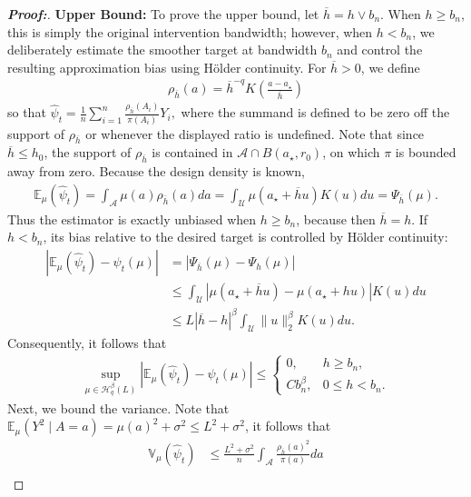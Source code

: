 \documentclass[11pt,twoside]{article}
\theoremstyle{definition}
\theoremstyle{remark}
\begin{document}
\begin{proof}[\textbf{Proof:}]
\textbf{Upper Bound:} To prove the upper bound, let $\overline h=h\vee b_n$. When $h\geq b_n$, this is simply the original intervention bandwidth; however, when $h<b_n$, we deliberately estimate the smoother target at bandwidth $b_n$ and control the resulting approximation bias using H\"older continuity. For $\overline{h}>0$, we define
\begin{align*}
    \rho_{\overline{h}}(a) = \overline{h}^{-q} K\!\left(\frac{a-a_\star}{\overline{h}}\right)
\end{align*}
so that $\widehat\psi_t = \frac{1}{n} \sum_{i=1}^n \frac{\rho_{\overline{h}}(A_i)}{\pi(A_i)}Y_i,$ where the summand is defined to be zero off the support of $\rho_{\overline{h}}$ or whenever the displayed ratio is undefined. Note that since $\overline{h}\leq h_0$, the support of $\rho_{\overline{h}}$ is contained in $\mathcal{A}\cap B(a_\star,r_0)$, on which $\pi$ is bounded away from zero. Because the design density is known,
\begin{align*}
    \mathbb{E}_\mu(\widehat\psi_t) = \int_{\mathcal{A}} \mu(a)\rho_{\overline{h}}(a)da = \int_{\mathcal{U}} \mu(a_\star+\overline h u)K(u)du = \Psi_{\overline{h}}(\mu).
\end{align*}
Thus the estimator is exactly unbiased when $h\geq b_n$, because then $\overline{h}=h$. If $h<b_n$, its bias relative to the desired target is controlled by H\"older continuity:
\begin{align*}
    \left| \mathbb{E}_\mu(\widehat\psi_t)-\psi_t(\mu) \right| &= |\Psi_{\overline{h}}(\mu)-\Psi_h(\mu)| \\
    &\leq \int_{\mathcal{U}} \left| \mu(a_\star+\overline{h} u) - \mu(a_\star+hu) \right| K(u)du \\
    &\leq L|\overline{h}-h|^\beta \int_{\mathcal{U}} \|u\|_2^\beta K(u)du.
\end{align*}
Consequently, it follows that
\begin{align*}
    \sup_{\mu\in\mathcal{H}_q^\beta(L)} \left| \mathbb{E}_\mu(\widehat\psi_t) -  \psi_t(\mu) \right| \leq
    \begin{cases}
        0, & h\geq b_n,\\
        Cb_n^\beta, & 0\leq h<b_n.
    \end{cases}
\end{align*}
Next, we bound the variance. Note that $\mathbb{E}_\mu(Y^2\mid A=a)=\mu(a)^2+\sigma^2\leq L^2+\sigma^2$, it follows that
\begin{align*}
    \mathbb{V}_\mu(\widehat\psi_t) &\leq \frac{L^2+\sigma^2}{n} \int_{\mathcal{A}} \frac{\rho_{\overline{h}}(a)^2}{\pi(a)}da \\

\end{align*}
\end{proof}
\end{document}
